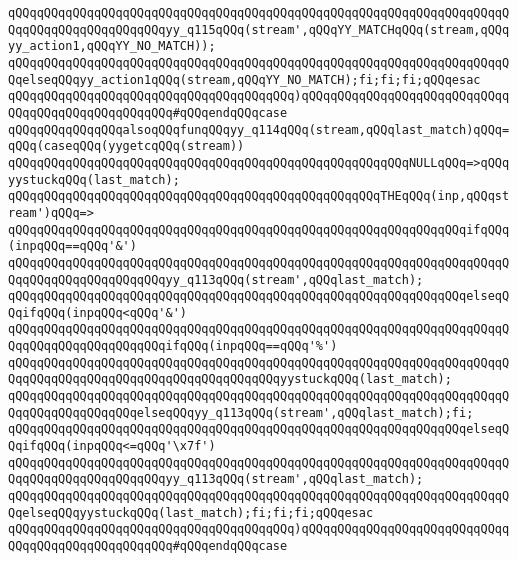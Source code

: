 \verb|qQQqqQQqqQQqqQQqqQQqqQQqqQQqqQQqqQQqqQQqqQQqqQQqqQQqqQQqqQQqqQQqqQQqqQQqqQQqqQQqqQQqqQQqqQQqyy_q115qQQq(stream',qQQqYY_MATCHqQQq(stream,qQQqyy_action1,qQQqYY_NO_MATCH));|\newline
\verb|qQQqqQQqqQQqqQQqqQQqqQQqqQQqqQQqqQQqqQQqqQQqqQQqqQQqqQQqqQQqqQQqqQQqqQQqelseqQQqyy_action1qQQq(stream,qQQqYY_NO_MATCH);fi;fi;fi;qQQqesac|\newline
\verb|qQQqqQQqqQQqqQQqqQQqqQQqqQQqqQQqqQQqqQQq)qQQqqQQqqQQqqQQqqQQqqQQqqQQqqQQqqQQqqQQqqQQqqQQqqQQq#qQQqendqQQqcase|\newline
\verb|qQQqqQQqqQQqqQQqalsoqQQqfunqQQqyy_q114qQQq(stream,qQQqlast_match)qQQq=qQQq(caseqQQq(yygetcqQQq(stream))|\newline
\verb|qQQqqQQqqQQqqQQqqQQqqQQqqQQqqQQqqQQqqQQqqQQqqQQqqQQqqQQqNULLqQQq=>qQQqyystuckqQQq(last_match);|\newline
\verb|qQQqqQQqqQQqqQQqqQQqqQQqqQQqqQQqqQQqqQQqqQQqqQQqqQQqTHEqQQq(inp,qQQqstream')qQQq=>|\newline
\verb|qQQqqQQqqQQqqQQqqQQqqQQqqQQqqQQqqQQqqQQqqQQqqQQqqQQqqQQqqQQqqQQqifqQQq(inpqQQq==qQQq'&')|\newline
\verb|qQQqqQQqqQQqqQQqqQQqqQQqqQQqqQQqqQQqqQQqqQQqqQQqqQQqqQQqqQQqqQQqqQQqqQQqqQQqqQQqqQQqqQQqqQQqyy_q113qQQq(stream',qQQqlast_match);|\newline
\verb|qQQqqQQqqQQqqQQqqQQqqQQqqQQqqQQqqQQqqQQqqQQqqQQqqQQqqQQqqQQqqQQqelseqQQqifqQQq(inpqQQq<qQQq'&')|\newline
\verb|qQQqqQQqqQQqqQQqqQQqqQQqqQQqqQQqqQQqqQQqqQQqqQQqqQQqqQQqqQQqqQQqqQQqqQQqqQQqqQQqqQQqqQQqqQQqifqQQq(inpqQQq==qQQq'%')|\newline
\verb|qQQqqQQqqQQqqQQqqQQqqQQqqQQqqQQqqQQqqQQqqQQqqQQqqQQqqQQqqQQqqQQqqQQqqQQqqQQqqQQqqQQqqQQqqQQqqQQqqQQqqQQqqQQqyystuckqQQq(last_match);|\newline
\verb|qQQqqQQqqQQqqQQqqQQqqQQqqQQqqQQqqQQqqQQqqQQqqQQqqQQqqQQqqQQqqQQqqQQqqQQqqQQqqQQqqQQqqQQqelseqQQqyy_q113qQQq(stream',qQQqlast_match);fi;|\newline
\verb|qQQqqQQqqQQqqQQqqQQqqQQqqQQqqQQqqQQqqQQqqQQqqQQqqQQqqQQqqQQqqQQqelseqQQqifqQQq(inpqQQq<=qQQq'\x7f')|\newline
\verb|qQQqqQQqqQQqqQQqqQQqqQQqqQQqqQQqqQQqqQQqqQQqqQQqqQQqqQQqqQQqqQQqqQQqqQQqqQQqqQQqqQQqqQQqqQQqyy_q113qQQq(stream',qQQqlast_match);|\newline
\verb|qQQqqQQqqQQqqQQqqQQqqQQqqQQqqQQqqQQqqQQqqQQqqQQqqQQqqQQqqQQqqQQqqQQqqQQqelseqQQqyystuckqQQq(last_match);fi;fi;fi;qQQqesac|\newline
\verb|qQQqqQQqqQQqqQQqqQQqqQQqqQQqqQQqqQQqqQQq)qQQqqQQqqQQqqQQqqQQqqQQqqQQqqQQqqQQqqQQqqQQqqQQqqQQq#qQQqendqQQqcase|\newline
